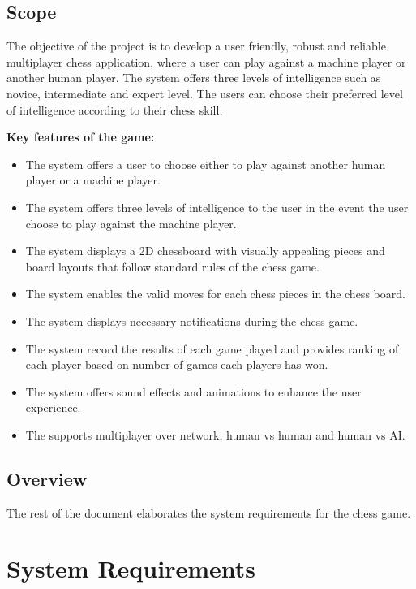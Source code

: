 \documentclass{article}
\begin{document}
\subsection{Scope}
	The objective of the project is to develop a user friendly, robust and reliable multiplayer chess application, where a user can play against a machine player or another human player. The system offers three levels of intelligence such as novice, intermediate and expert level. The users can choose their preferred level of intelligence according to their chess skill.
	\vspace{3mm}
	
	\textbf{Key features of the game:}
	\begin{itemize}
		\item The system offers a user to choose either to play against another human player or a machine player.
		\item The system offers three levels of intelligence to the user in the event the user choose to play against the machine player.
		\item The system displays a 2D chessboard with visually appealing pieces and board layouts that follow standard rules of the chess game.
		\item The system enables the valid moves for each chess pieces in the chess board.
		\item The system displays necessary notifications during the chess game.   
		\item The system record the results of each game played and provides ranking of each player based on number of games each players has won.
		\item The system offers sound effects and animations to enhance the user experience.
		\item The supports multiplayer over network, human vs human and human vs AI.
	\end{itemize}

\subsection{Overview}
The rest of the document elaborates the system requirements for the chess game.

\section{System Requirements}
\end{document}
